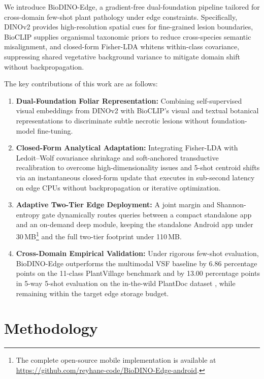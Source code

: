 \documentclass[conference]{IEEEtran}
\begin{document}
We introduce BioDINO-Edge, a gradient-free dual-foundation pipeline tailored for cross-domain few-shot plant pathology under edge constraints. Specifically, DINOv2 \cite{oquab2023dinov2} provides high-resolution spatial cues for fine-grained lesion boundaries, BioCLIP \cite{stevens2024bioclip} supplies organismal taxonomic priors to reduce cross-species semantic misalignment, and closed-form Fisher-LDA whitens within-class covariance, suppressing shared vegetative background variance to mitigate domain shift without backpropagation.

The key contributions of this work are as follows:
\begin{enumerate}
    \item \textbf{Dual-Foundation Foliar Representation:} Combining self-supervised visual embeddings from DINOv2 with BioCLIP's visual and textual botanical representations to discriminate subtle necrotic lesions without foundation-model fine-tuning.
    \item \textbf{Closed-Form Analytical Adaptation:} Integrating Fisher-LDA \cite{fisher1936use} with Ledoit--Wolf covariance shrinkage \cite{ledoit2004well} and soft-anchored transductive recalibration to overcome high-dimensionality issues and 5-shot centroid shifts via an instantaneous closed-form update that executes in sub-second latency on edge CPUs without backpropagation or iterative optimization.
    \item \textbf{Adaptive Two-Tier Edge Deployment:} A joint margin and Shannon-entropy \cite{shannon1948mathematical} gate dynamically routes queries between a compact standalone app and an on-demand deep module, keeping the standalone Android app under 30\,MB\footnote{The complete open-source mobile implementation is available at \url{https://github.com/reyhane-code/BioDINO-Edge-android}.} and the full two-tier footprint under 110\,MB.
    \item \textbf{Cross-Domain Empirical Validation:} Under rigorous few-shot evaluation, BioDINO-Edge outperforms the multimodal VSF \cite{zhou2026vsf} baseline by 6.86 percentage points on the 11-class PlantVillage benchmark \cite{hughes2012plantvillage} and by 13.00 percentage points in 5-way 5-shot evaluation on the in-the-wild PlantDoc dataset \cite{singh2020plantdoc}, while remaining within the target edge storage budget.
\end{enumerate}

\section{Methodology}
\label{sec:architecture}
\end{document}
